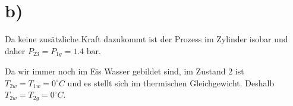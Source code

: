 

\section*{b)}

Da keine zusätzliche Kraft dazukommt ist der Prozess im Zylinder isobar und daher $P_{23} = P_{1g} = 1.4 \text{ bar}$.

Da wir immer noch im Eis Wasser gebildet sind, im Zustand 2 ist $T_{2w} = T_{1w} = 0^\circ C$ und es stellt sich im thermischen Gleichgewicht. Deshalb $T_{2w} = T_{2g} = 0^\circ C$.